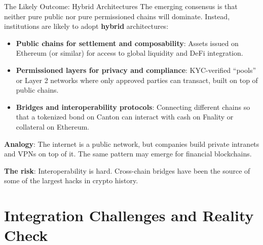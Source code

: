 \documentclass[10pt]{beamer}
\newcommand{\highlight}[1]{\textcolor{AccentOrange}{\textbf{#1}}}
\begin{document}
\begin{frame}{The Likely Outcome: Hybrid Architectures}
  The emerging consensus is that neither pure public nor pure permissioned chains will dominate. Instead, institutions are likely to adopt \highlight{hybrid} architectures:
  
  \vspace{0.5em}
  \begin{itemize}
    \item \textbf{Public chains for settlement and composability}: Assets issued on Ethereum (or similar) for access to global liquidity and DeFi integration.
    \item \textbf{Permissioned layers for privacy and compliance}: KYC-verified ``pools'' or Layer 2 networks where only approved parties can transact, built on top of public chains.
    \item \textbf{Bridges and interoperability protocols}: Connecting different chains so that a tokenized bond on Canton can interact with cash on Fnality or collateral on Ethereum.
  \end{itemize}
  
  \vspace{0.5em}
  \textbf{Analogy}: The internet is a public network, but companies build private intranets and VPNs on top of it. The same pattern may emerge for financial blockchains.
  
  \vspace{0.3em}
  \textbf{The risk}: Interoperability is hard. Cross-chain bridges have been the source of some of the largest hacks in crypto history.
\end{frame}

\section{Integration Challenges and Reality Check}
\end{document}
